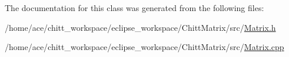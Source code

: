 \-The documentation for this class was generated from the following files\-:\begin{DoxyCompactItemize}
\item 
/home/ace/chitt\-\_\-workspace/eclipse\-\_\-workspace/\-Chitt\-Matrix/src/\hyperlink{Matrix_8h}{\-Matrix.\-h}\item 
/home/ace/chitt\-\_\-workspace/eclipse\-\_\-workspace/\-Chitt\-Matrix/src/\hyperlink{Matrix_8cpp}{\-Matrix.\-cpp}\end{DoxyCompactItemize}
